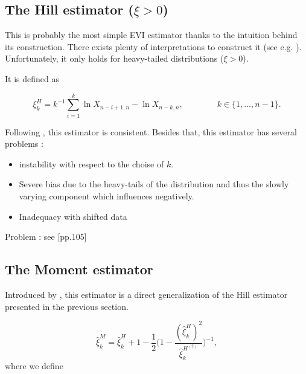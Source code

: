 \documentclass[11pt,a4paper,openany ]{book}
\begin{document}
\subsection*{The Hill estimator ($\xi>0$)}


This is probably the most simple EVI estimator thanks to the intuition behind its construction. There exists plenty of interpretations to construct it (see e.g. \citet[pp.101-104]{beirlant_statistics_2006}). Unfortunately, it only holds for heavy-tailed distributions ($\xi>0$). 




It is defined as 

\begin{equation}
\xi^H_{k}=k^{-1}\sum_{i=1}^k\ln X_{n-i+1,n}-\ln X_{n-k,n}, \qquad\qquad k\in\{1,\dots,n-1\}.
\end{equation}



Following \cite{mason_}, this estimator is consistent. Besides that, this estimator has several problems : 

\begin{itemize}
	\item instability with respect to the choise of $k$.
	\item Severe bias due to the heavy-tails of the distribution and thus the slowly varying component which influences negatively.
	\item Inadequacy with shifted data
\end{itemize}


Problem : see [pp.105]


\subsection*{The Moment estimator}

Introduced by \cite{dekkers_moment_1989}, this estimator is a direct generalization of the Hill estimator presented in the previous section. 

\begin{equation}
\hat{\xi}^M_k=\hat{\xi}_k^H+1-\frac{1}{2}\Bigg(1-\frac{(\hat{\xi}_k^H)^2}{\hat{\xi}^{H^{(2)}}_k }\Bigg)^{-1},
\end{equation}
where we define 
\end{document}
